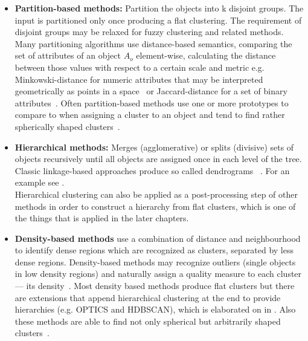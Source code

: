 \begin{itemize}
    \item \textbf{Partition-based methods:} Partition the objects into k disjoint groups. The input is partitioned only once producing a flat clustering. The requirement of disjoint groups may be relaxed for fuzzy clustering and related methods. Many partitioning algorithms use distance-based semantics, comparing the set of attributes of an object $A_{o}$ element-wise, calculating the distance between those values with respect to a certain scale and metric e.g. Minkowski-distance for numeric attributes that may be interpreted geometrically as points in a space~\cite{THEODORIDIS2009701} or Jaccard-distance for a set of binary attributes~\cite{DBLP:journals/corr/Kosub16}. Often partition-based methods use one or more prototypes to compare to when assigning a cluster to an object and tend to find rather spherically shaped clusters~\cite{han2011data}. \\
    
    \item \textbf{Hierarchical methods:} Merges (agglomerative) or splits (divisive) sets of objects recursively until all objects are assigned once in each level of the tree. Classic linkage-based approaches produce so called dendrograms~\cite{han2011data, Murtagh_2012, murtagh2010ultrametric} . For an example see . \\
    Hierarchical clustering can also be applied as a post-processing step of other methods in order to construct a hierarchy from flat clusters, which is one of the things that is applied in the later chapters. \\
    
    \item \textbf{Density-based methods} use a combination of distance and neighbourhood to identify dense regions which are recognized as clusters, separated by less dense regions. Density-based methods may recognize outliers (single objects in low density regions) and naturally assign a quality measure to each cluster --- its density~\cite{mcinnes2017accelerated, hdbscan, dbscan, optics}. Most density based methods produce flat clusters but there are extensions that append hierarchical clustering at the end to provide hierarchies (e.g. OPTICS and HDBSCAN), which is elaborated on in . Also these methods are able to find not only spherical but arbitrarily shaped clusters~\cite{dbscan}.  \\
    

\end{itemize}
